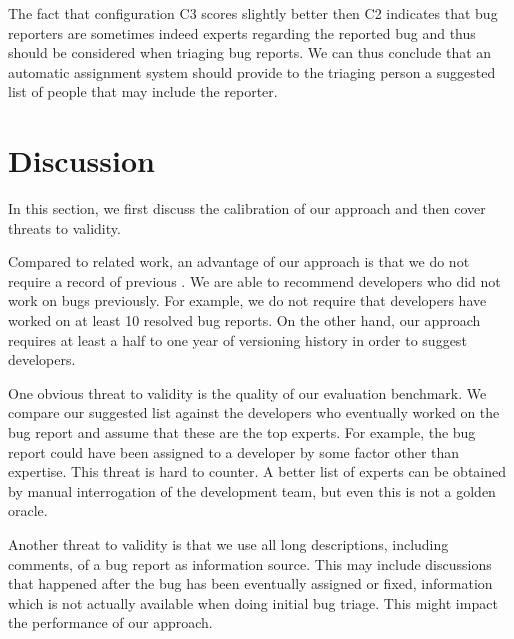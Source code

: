 \documentclass[10pt]{book}
\begin{document}
The fact that configuration C3 scores slightly better then C2 indicates that bug reporters are sometimes indeed experts regarding the reported bug and thus should be considered when triaging bug reports. We can thus conclude that an automatic assignment system should provide to the triaging person a suggested list of people that may include the reporter.

\section{Discussion}\label{sec:discussion}

In this section, we first discuss the calibration of our approach and then cover threats to validity.

Compared to related work, an advantage of our approach is that we do not require a record of previous \BRs. We are able to recommend developers who did not work on bugs previously. For example, we do not require that developers have worked on at least 10 resolved bug reports. On the other hand, our approach requires at least a half to one year of versioning history in order to suggest developers. 

One obvious threat to validity is the quality of our evaluation benchmark. We compare our suggested list against the developers who eventually worked on the bug report and assume that these are the top experts. For example, the bug report could have been assigned to a developer by some factor other than expertise. This threat is hard to counter. A better list of experts can be obtained by manual interrogation of the development team, but even this is not a golden oracle.

Another threat to validity is that we use all long descriptions, including comments, of a bug report as information source. This may include discussions that happened after the bug has been eventually assigned or fixed, information which is not actually available when doing initial bug triage. This might impact the performance of our approach. 
\end{document}
